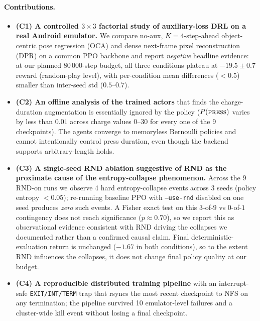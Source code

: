 \documentclass{article}
\begin{document}
\paragraph{Contributions.}
\begin{itemize}
  \item \textbf{(C1) A controlled $3{\times}3$ factorial study of
        auxiliary-loss DRL on a real Android emulator.} We compare
        no-aux, $K{=}4$-step-ahead object-centric pose regression
        (OCA) and dense next-frame pixel reconstruction (DPR) on a
        common PPO backbone and report \emph{negative} headline
        evidence: at our planned $80\,000$-step budget, all three
        conditions plateau at $-19.5 \pm 0.7$ reward (random-play
        level), with per-condition mean differences ($<\!0.5$)
        smaller than inter-seed std ($0.5$--$0.7$).
  \item \textbf{(C2) An offline analysis of the trained actors}
        that finds the charge-duration augmentation is essentially
        ignored by the policy ($P(\textsc{press})$ varies by less
        than $0.01$ across charge values $0$--$30$ for every one of
        the 9 checkpoints). The agents converge to memoryless
        Bernoulli policies and cannot intentionally control press
        duration, even though the backend supports arbitrary-length
        holds.
  \item \textbf{(C3) A single-seed RND ablation suggestive of
        RND as the proximate cause of the entropy-collapse
        phenomenon.} Across the 9 RND-on runs we observe 4 hard
        entropy-collapse events across 3 seeds (policy entropy
        $<\!0.05$); re-running baseline PPO with \texttt{--use-rnd}
        disabled on one seed produces \emph{zero} such events. A
        Fisher exact test on this $3$-of-$9$ vs $0$-of-$1$
        contingency does not reach significance
        ($p \approx 0.70$), so we report this as observational
        evidence consistent with RND driving the collapses we
        documented rather than a confirmed causal claim. Final
        deterministic-evaluation return is unchanged ($-1.67$ in
        both conditions), so to the extent RND influences the
        collapses, it does not change final policy quality at our
        budget.
  \item \textbf{(C4) A reproducible distributed training pipeline}
        with an interrupt-safe \texttt{EXIT/INT/TERM} trap that
        rsyncs the most recent checkpoint to NFS on any termination;
        the pipeline survived 10 emulator-level failures and a
        cluster-wide kill event without losing a final checkpoint.
\end{itemize}
\end{document}
